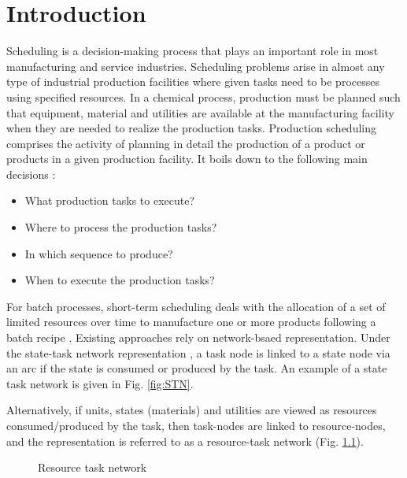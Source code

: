 \chapter{Introduction}
\thispagestyle{plain}

Scheduling is a decision-making process that plays an important role in most manufacturing and service industries. %
Scheduling problems arise in almost any type of industrial production facilities where given tasks need to be processes using specified resources. In a chemical process, production must be planned such that equipment, material and utilities are available at the manufacturing facility when they are needed to realize the production tasks. Production scheduling comprises the activity of planning in detail the production of a product or products in a given production facility. It boils down to the following main decisions \citep{HARJUNKOSKI2014161}:
\begin{itemize}
\item What production tasks to execute?
\item Where to process the production tasks?
\item In which sequence to produce?
\item When to execute the production tasks?
\end{itemize}

For batch processes, short-term scheduling deals with the allocation of a set of limited resources over time to manufacture one or more products following a batch recipe \citep{MENDEZ}. Existing approaches rely on network-bsaed representation. Under the state-task network representation \citep{KONDILI1993211}, a task node is linked to a state node via an arc if the state is consumed or produced by the task. An example of a state task network is given in Fig. \ref{fig:STN}.

Alternatively, if units, states (materials) and utilities are viewed as resources consumed/produced by the task, then task-nodes are linked to resource-nodes, and the representation is referred to as a resource-task network (Fig. \ref{fig:RTN}). 

\begin{figure}[htb]
\centering
{}
\caption{Resource task network}
\label{fig:RTN}
\end{figure}


